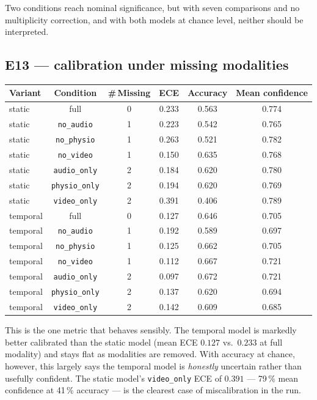\documentclass[11pt,a4paper]{article}
\newcommand{\code}[1]{\texttt{\small #1}}
\begin{document}
\noindent
Two conditions reach nominal significance, but with seven comparisons and no multiplicity
correction, and with both models at chance level, neither should be interpreted.

\subsection{E13 --- calibration under missing modalities}

\begin{center}\small
\begin{tabular}{lccccc}
\toprule
Variant & Condition & \#\,Missing & ECE & Accuracy & Mean confidence \\
\midrule
static & full          & 0 & 0.233 & 0.563 & 0.774 \\
static & \code{no\_audio}    & 1 & 0.223 & 0.542 & 0.765 \\
static & \code{no\_physio}   & 1 & 0.263 & 0.521 & 0.782 \\
static & \code{no\_video}    & 1 & 0.150 & 0.635 & 0.768 \\
static & \code{audio\_only}  & 2 & 0.184 & 0.620 & 0.780 \\
static & \code{physio\_only} & 2 & 0.194 & 0.620 & 0.769 \\
static & \code{video\_only}  & 2 & 0.391 & 0.406 & 0.789 \\
\midrule
temporal & full          & 0 & 0.127 & 0.646 & 0.705 \\
temporal & \code{no\_audio}    & 1 & 0.192 & 0.589 & 0.697 \\
temporal & \code{no\_physio}   & 1 & 0.125 & 0.662 & 0.705 \\
temporal & \code{no\_video}    & 1 & 0.112 & 0.667 & 0.721 \\
temporal & \code{audio\_only}  & 2 & 0.097 & 0.672 & 0.721 \\
temporal & \code{physio\_only} & 2 & 0.137 & 0.620 & 0.694 \\
temporal & \code{video\_only}  & 2 & 0.142 & 0.609 & 0.685 \\
\bottomrule
\end{tabular}
\end{center}

\noindent
This is the one metric that behaves sensibly. The temporal model is markedly better
calibrated than the static model (mean ECE $0.127$ vs.\ $0.233$ at full modality) and
stays flat as modalities are removed. With accuracy at chance, however, this largely says
the temporal model is \emph{honestly} uncertain rather than usefully confident. The static
model's \code{video\_only} ECE of $0.391$ --- 79\,\% mean confidence at 41\,\% accuracy ---
is the clearest case of miscalibration in the run.
\end{document}
